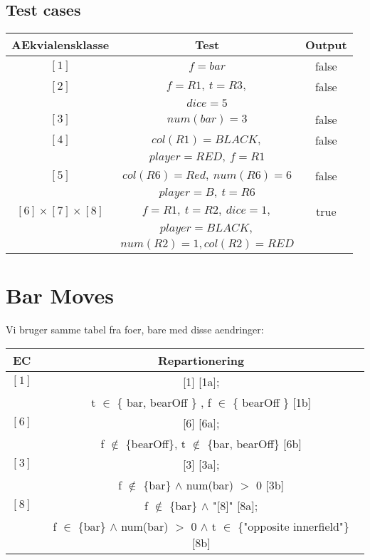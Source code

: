 \documentclass[a4paper]{article}
\begin{document}
\subsection{Test cases}
\label{1:testcases}

\begin{tabular}{c|c|c}
AEkvialensklasse        & Test                      & Output    \\
\toprule
$[1]$                   & $f=bar$                   & false     \\
\midrule
$[2]$                   & $f=R1,\ t=R3,$            & false     \\
                        & $dice=5$                  &           \\
\midrule
$[3]$                   & $num(bar)=3$              & false     \\
\midrule
$[4]$                   & $col(R1)=BLACK,$          & false     \\
                        & $player=RED,\ f=R1$       &           \\
\midrule
$[5]$                   & $col(R6)=Red,\ num(R6)=6$ & false     \\
                        & $player=B,\ t=R6$         &           \\
\midrule
$[6]\times[7]\times[8]$ & $f=R1,\ t=R2,\ dice=1,$   & true      \\
                        & $player=BLACK,$           &           \\
                        & $num(R2)=1,col(R2)=RED$   &           \\
\bottomrule
\end{tabular}

\section{Bar Moves}
Vi bruger samme tabel fra foer, bare med disse aendringer:

\begin{tabular}{c|c}
EC & Repartionering \\
\toprule
$[1]$ & [1] [1a]; \\
      & t $\in$ \{ bar, bearOff \} , f $\in$ \{ bearOff \}  [1b] \\
\midrule
$[6]$ & [6] [6a]; \\
      & f $\notin$ \{bearOff\}, t $\notin$ \{bar, bearOff\} [6b] \\
\midrule
$[3]$ & [3] [3a]; \\
      & f $\notin$ \{bar\} $\wedge$ num(bar) $>$ 0 [3b] \\
\midrule
$[8]$ & f $\notin$ \{bar\} $\wedge$ "[8]" [8a]; \\
      & f $\in$ \{bar\} $\wedge$ num(bar) $>$ 0 $\wedge$ t $\in$
        \{"opposite innerfield"\} [8b] \\

\bottomrule
\end{tabular}
\end{document}
